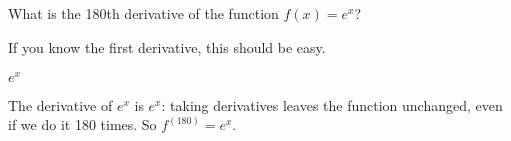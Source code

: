 %
%

\subsection*{\Conceptual}




\begin{question}What is the 180th derivative of the function $f(x)=e^x$?
\end{question}
\begin{hint} If you know the first derivative, this should be easy.
\end{hint}
\begin{answer} $e^x$
\end{answer}
\begin{solution} The derivative of $e^x$ is $e^x$: taking derivatives leaves the function unchanged, even if we do it 180 times. So $f^{(180)}=e^x$.
\end{solution}





